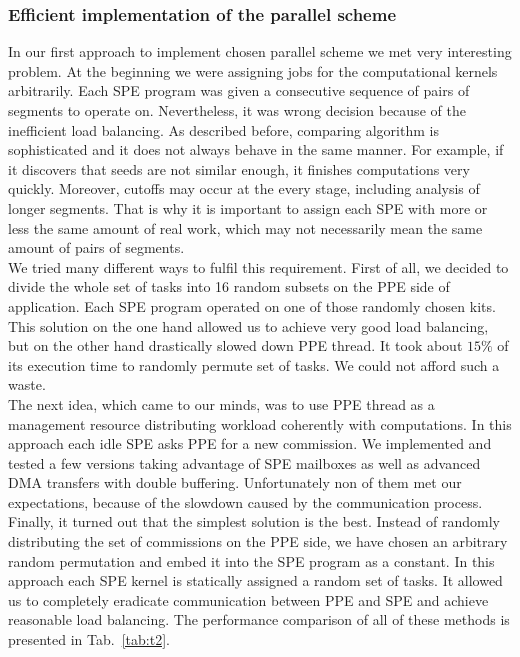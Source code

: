 \subsubsection{Efficient implementation of the parallel scheme}
In our first approach to implement chosen parallel scheme we met very
interesting problem.
At the beginning we were assigning jobs for the computational kernels
arbitrarily.
Each SPE program was given a consecutive sequence of pairs of segments to
operate on.
Nevertheless, it was wrong decision because of the inefficient load balancing.
As described before, comparing algorithm is sophisticated and it does not always
behave in the same manner.
For example, if it discovers that seeds are not similar enough, it finishes
computations very quickly.
Moreover, cutoffs may occur at the every stage, including analysis of longer
segments.
That is why it is important to assign each SPE with more or less the same
amount of real work, which may not necessarily mean the same amount of pairs of
segments.\\
We tried many different ways to fulfil this requirement.
First of all, we decided to divide the whole set of tasks into 16 random subsets
on the PPE side of application.
Each SPE program operated on one of those randomly chosen kits.
This solution on the one hand allowed us to achieve very good load balancing,
but on the other hand drastically slowed down PPE thread.
It took about $15\%$ of its execution time to randomly permute set of tasks.
We could not afford such a waste.\\
The next idea, which came to our minds, was to use PPE thread as a management
resource distributing workload coherently with computations.
In this approach each idle SPE asks PPE for a new commission.
We implemented and tested a few versions taking advantage of SPE mailboxes
as well as advanced DMA transfers with double buffering.
Unfortunately non of them met our expectations, because of the slowdown caused
by the communication process.\\
Finally, it turned out that the simplest solution is the best.
Instead of randomly distributing the set of commissions on the PPE side, we have
chosen an arbitrary random permutation and embed it into the SPE program as a
constant.
In this approach each SPE kernel is statically assigned a random set of tasks.
It allowed us to completely eradicate communication between PPE and SPE and
achieve reasonable load balancing.
The performance comparison of all of these methods is presented in
Tab.~\ref{tab:t2}.

